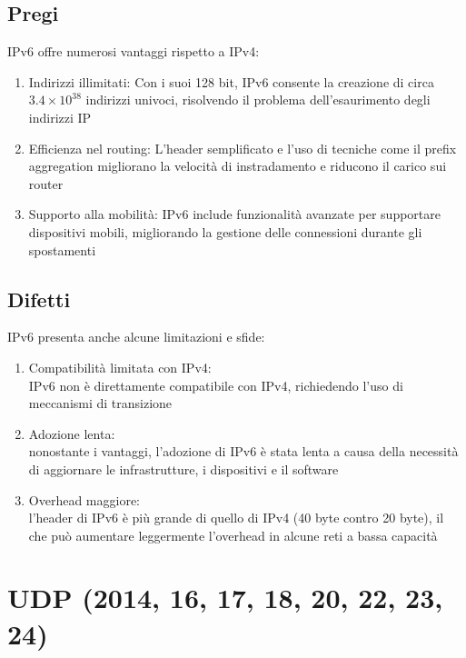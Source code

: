 \documentclass[10pt,oneside,a4paper]{article}
\begin{document}
\subsection{Pregi}
IPv6 offre numerosi vantaggi rispetto a IPv4:
\begin{enumerate}
\item Indirizzi illimitati: Con i suoi 128 bit, IPv6 consente la creazione di circa $3.4 \times 10^{38}$ indirizzi univoci, risolvendo il problema dell'esaurimento degli indirizzi IP
\item Efficienza nel routing: L'header semplificato e l'uso di tecniche come il prefix aggregation migliorano la velocità di instradamento e riducono il carico sui router
\item Supporto alla mobilità: IPv6 include funzionalità avanzate per supportare dispositivi mobili, migliorando la gestione delle connessioni durante gli spostamenti
\end{enumerate}
\subsection{Difetti}
IPv6 presenta anche alcune limitazioni e sfide:
\begin{enumerate}
\item Compatibilità limitata con IPv4:\\
IPv6 non è direttamente compatibile con IPv4, richiedendo l'uso di meccanismi di transizione
\item Adozione lenta:\\
nonostante i vantaggi, l'adozione di IPv6 è stata lenta a causa della necessità di aggiornare le infrastrutture, i dispositivi e il software
\item Overhead maggiore:\\
l'header di IPv6 è più grande di quello di IPv4 (40 byte contro 20 byte), il che può aumentare leggermente l'overhead in alcune reti a bassa capacità
\end{enumerate}
\section{UDP (2014, 16, 17, 18, 20, 22, 23, 24)}
\end{document}
